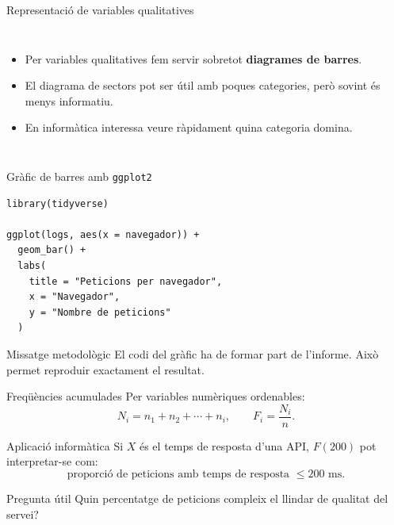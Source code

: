 \documentclass[10pt,aspectratio=169]{beamer}
\newcommand{\important}[1]{\textcolor{UABGreen}{\textbf{#1}}}
\begin{document}
\begin{frame}{Representació de variables qualitatives}
\begin{columns}[T]
\begin{itemize}
  \item Per variables qualitatives fem servir sobretot \important{diagrames de barres}.
  \item El diagrama de sectors pot ser útil amb poques categories, però sovint és menys informatiu.
  \item En informàtica interessa veure ràpidament quina categoria domina.
\end{itemize}
\end{columns}
\end{frame}

\begin{frame}[fragile]{Gràfic de barres amb \texttt{ggplot2}}
\begin{lstlisting}
library(tidyverse)

ggplot(logs, aes(x = navegador)) +
  geom_bar() +
  labs(
    title = "Peticions per navegador",
    x = "Navegador",
    y = "Nombre de peticions"
  )
\end{lstlisting}
\vspace{0.15cm}
\begin{block}{Missatge metodològic}
El codi del gràfic ha de formar part de l'informe. Això permet reproduir exactament el resultat.
\end{block}
\end{frame}

\begin{frame}{Freqüències acumulades}
Per variables numèriques ordenables:
\[
N_i = n_1 + n_2 + \cdots + n_i, \qquad F_i = \frac{N_i}{n}.
\]
\vspace{0.3cm}
\begin{block}{Aplicació informàtica}
Si $X$ és el temps de resposta d'una API, $F(200)$ pot interpretar-se com:
\[
\text{proporció de peticions amb temps de resposta } \leq 200 \text{ ms}.
\]
\end{block}
\vspace{0.15cm}
\begin{alertblock}{Pregunta útil}
Quin percentatge de peticions compleix el llindar de qualitat del servei?
\end{alertblock}
\end{frame}
\end{document}
